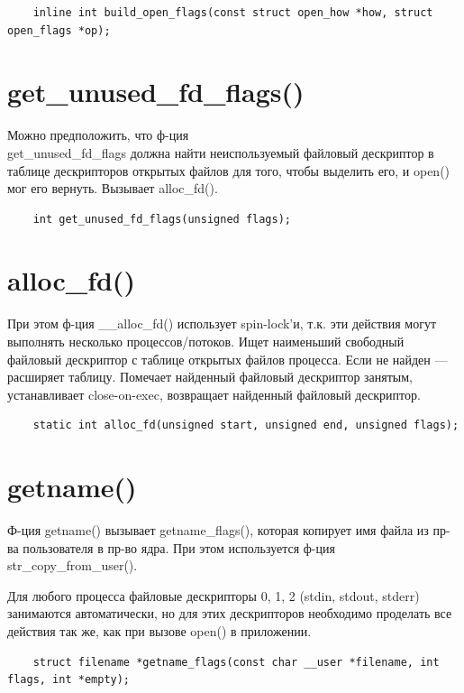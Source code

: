 \begin{lstlisting}
	inline int build_open_flags(const struct open_how *how, struct open_flags *op);
\end{lstlisting}

\section{get\_unused\_fd\_flags()}
Можно предположить, что ф-ция \\ get\_unused\_fd\_flags должна найти неиспользуемый файловый дескриптор в таблице дескрипторов открытых файлов для того, чтобы выделить его, и open() мог его вернуть. Вызывает alloc\_fd().

\begin{lstlisting}
	int get_unused_fd_flags(unsigned flags);
\end{lstlisting}

\section{alloc\_fd()}
При этом ф-ция \_\_alloc\_fd() использует spin-lock'и, т.к. эти действия могут выполнять несколько процессов/потоков. Ищет наименьший свободный файловый дескриптор с таблице открытых файлов процесса. Если не найден ---  расширяет таблицу. Помечает найденный файловый дескриптор занятым, устанавливает close-on-exec, возвращает найденный файловый дескриптор.

\begin{lstlisting}
	static int alloc_fd(unsigned start, unsigned end, unsigned flags);
\end{lstlisting}

\section{getname()}
Ф-ция getname() вызывает getname\_flags(), которая копирует имя файла из пр-ва пользователя в пр-во ядра. При этом используется ф-ция str\_copy\_from\_user().

Для любого процесса файловые дескрипторы 0, 1, 2 (stdin, stdout, stderr) занимаются автоматически, но для этих дескрипторов необходимо проделать все действия так же, как при вызове open() в приложении.

\begin{lstlisting}
	struct filename *getname_flags(const char __user *filename, int flags, int *empty);
\end{lstlisting}

